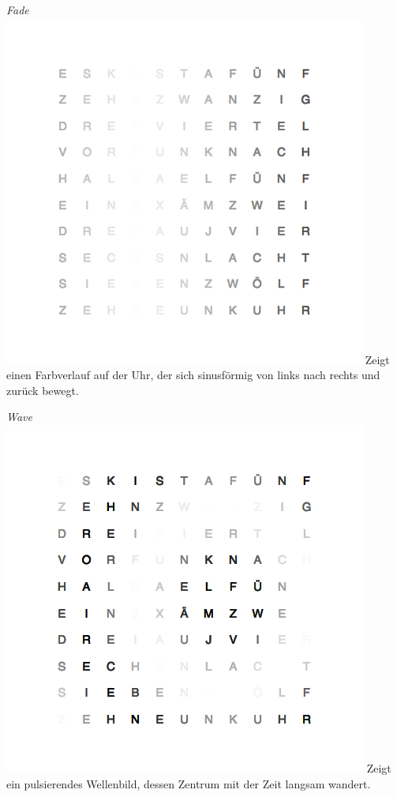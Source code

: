 \emph{Fade} \\
\includegraphics[width=\columnwidth]{Abbildungen/Demo/Fade}
Zeigt einen Farbverlauf auf der Uhr, der sich sinusförmig von links nach rechts und zurück bewegt.

\emph{Wave} \\
\includegraphics[width=\columnwidth]{Abbildungen/Demo/Welle}
Zeigt ein pulsierendes Wellenbild, dessen Zentrum mit der Zeit langsam wandert.

